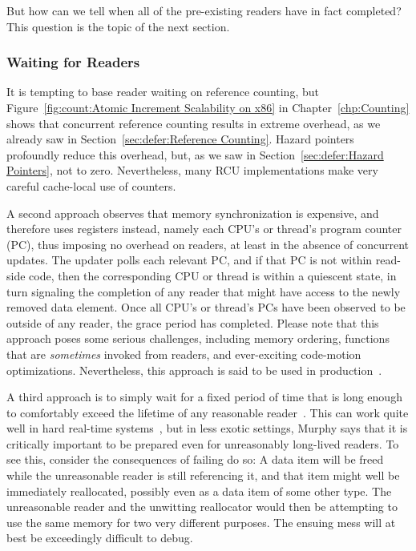But how can we tell when all of the pre-existing readers have in
fact completed?
This question is the topic of the next section.

\fi

\subsubsection{Waiting for Readers}
\label{sec:defer:Waiting for Readers}

It is tempting to base reader waiting on reference counting, but
Figure~\ref{fig:count:Atomic Increment Scalability on x86}
in
Chapter~\ref{chp:Counting}
shows that concurrent reference counting results in extreme overhead,
as we already saw in
Section~\ref{sec:defer:Reference Counting}.
Hazard pointers profoundly reduce this overhead, but, as we saw in
Section~\ref{sec:defer:Hazard Pointers}, not to zero.
Nevertheless, many RCU implementations make very careful cache-local
use of counters.

A second approach observes that memory synchronization is expensive,
and therefore uses registers instead, namely each CPU's or thread's
program counter (PC), thus imposing no overhead on readers, at least
in the absence of concurrent updates.
The updater polls each relevant PC, and if that PC is not within read-side
code, then the corresponding CPU or thread is within a quiescent state,
in turn signaling the completion of any reader that might have access
to the newly removed data element.
Once all CPU's or thread's PCs have been observed to be outside of any
reader, the grace period has completed.
Please note that this approach poses some serious challenges, including
memory ordering, functions that are \emph{sometimes} invoked from readers,
and ever-exciting code-motion optimizations.
Nevertheless, this approach is said to be used in
production~\cite{MikeAsh2015Apple}.

A third approach is to simply wait for a fixed period of time that is
long enough to comfortably exceed the lifetime of any reasonable
reader~\cite{Jacobson93,AjuJohn95}.
This can work quite well in hard real-time systems~\cite{YuxinRen2018RTRCU},
but in less exotic
settings, Murphy says that it is critically important to be prepared
even for unreasonably long-lived readers.
To see this, consider the consequences of failing do so:
A data item will be freed while the unreasonable reader is still
referencing it, and that item might well be immediately reallocated,
possibly even as a data item of some other type.
The unreasonable reader and the unwitting reallocator would then
be attempting to use the same memory for two very different purposes.
The ensuing mess will at best be exceedingly difficult to debug.

